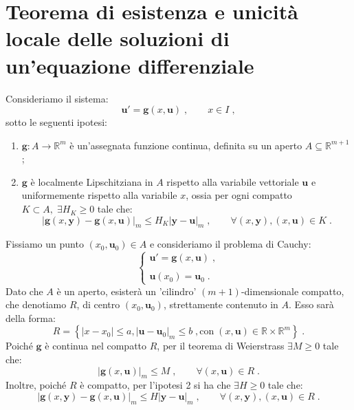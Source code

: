 \documentclass[a4paper,12pt]{report}
\theoremstyle{plain}
\theoremstyle{definition}
\theoremstyle{remark}
\numberwithin{equation}{section}
\begin{document}
\section{Teorema di esistenza e unicità locale delle soluzioni di un'equazione differenziale}
 Consideriamo il sistema:
\begin{equation}
\mathbf{u}'=\mathbf{g}(x,\mathbf{u})\;, \qquad x \in I\;,
\end{equation}
sotto le seguenti ipotesi:
\begin{enumerate}
 \item $\mathbf{g}:A \to \mathbb{R}^{m}$ è un'assegnata funzione continua, definita su un aperto $A \subseteq \mathbb{R}^{m+1}$;
 \item $\mathbf{g}$ è localmente Lipschitziana in $A$ rispetto alla variabile vettoriale $\mathbf{u}$ e uniformemente rispetto alla 
variabile $x$, ossia per ogni compatto $K \subset A,\; \exists H_K \ge 0$ tale che:
\begin{equation}
|\mathbf{g}(x,\mathbf{y})-\mathbf{g}(x,\mathbf{u})|_m \le H_K |\mathbf{y}-\mathbf{u}|_m\;, \qquad \forall (x,\mathbf{y}),(x,\mathbf{u}) \in K\;.
\end{equation}
\end{enumerate}
Fissiamo un punto $(x_0,\mathbf{u}_0) \in A$ e consideriamo il problema di Cauchy:
\begin{equation}
\begin{cases}
 \mathbf{u}'=\mathbf{g}(x,\mathbf{u})\;, \\
 \\
\mathbf{u}(x_0)=\mathbf{u}_0\;.
\end{cases}
\end{equation}
Dato che $A$ è un aperto, esisterà un 'cilindro' $(m+1)$-dimensionale compatto, che denotiamo $R$, di centro $(x_0,\mathbf{u}_0)$, 
strettamente contenuto in $A$. Esso sarà della forma:
\begin{equation}
R=\left\{|x-x_0|\le a, |\mathbf{u}-\mathbf{u}_0|_m\le b\;, \mbox{con}\; (x,\mathbf{u})\in\mathbb{R}\times\mathbb{R}^m\right\}\;.
\end{equation}
Poiché $\mathbf{g}$ è continua nel compatto $R$, per il teorema di Weierstrass $\exists M\ge 0$ tale che:
\begin{equation}
|\mathbf{g}(x,\mathbf{u})|_{m} \le M\;, \qquad \forall (x,\mathbf{u}) \in R\;.
\end{equation}
Inoltre, poiché $R$ è compatto, per l'ipotesi 2 si ha che $\exists H \ge 0$ tale che:
\begin{equation}
|\mathbf{g}(x,\mathbf{y})-\mathbf{g}(x,\mathbf{u})|_m \le H |\mathbf{y}-\mathbf{u}|_m\;, \qquad \forall (x,\mathbf{y}),(x,\mathbf{u}) \in R\;.
\end{equation}
\end{document}
